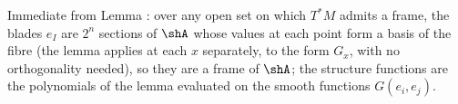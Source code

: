 Immediate from Lemma : over any open set on which $T^*M$ admits a frame, the blades $e_I$ are $2^n$ sections of $\shA$ whose values at each point form a basis of the fibre (the lemma applies at each $x$ separately, to the form $G_x$, with no orthogonality needed), so they are a frame of $\shA$; the structure functions are the polynomials of the lemma evaluated on the smooth functions $G(e_i, e_j)$.

